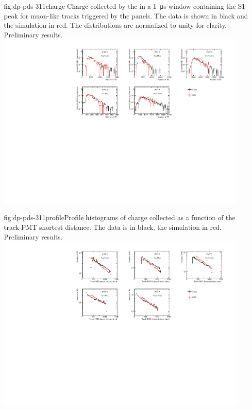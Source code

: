 \begin{dunefigure}{fig:dp-pds-311charge}{ Charge collected by the  in a \SI{1}{\us} window containing the S1 peak for muon-like tracks triggered by the  panels. The data is shown in black and the simulation in red. The distributions are normalized to unity for clarity. Preliminary results.}
\includegraphics[width=0.95\textwidth]{graphics/dppd_311_charge_mc_v2.pdf}
\end{dunefigure}

\begin{dunefigure}{fig:dp-pds-311profile}{Profile histograms of charge collected as a function of the track-PMT shortest distance. The data is in black, the simulation in red. Preliminary results.}
\includegraphics[width=0.95\textwidth]{graphics/dppd_311_charge_dist_mc.pdf}
\end{dunefigure}

